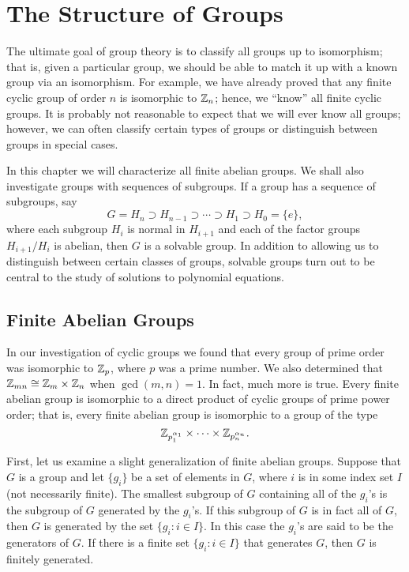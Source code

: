 \chapter{The Structure of  Groups}
 
 
 
The ultimate goal of group theory is to classify all groups up to
isomorphism; that is, given a particular group, we should be able to
match it up with a known group via an isomorphism. For example, we
have already proved that any finite cyclic group of order $n$ is
isomorphic to ${\Bbb Z}_n$; hence, we ``know'' all finite cyclic
groups. It is probably not reasonable to expect that we will ever know
all groups; however, we can often classify certain types of groups or
distinguish between groups in special cases.  
 
 
In this chapter we will characterize all finite abelian groups. We
shall also investigate groups with sequences of subgroups.  If a group
has a sequence of subgroups, say 
\[
G = H_n \supset H_{n-1} \supset \cdots \supset H_1 \supset H_0 = \{ e
\}, 
\]
where each subgroup $H_i$ is normal in $H_{i+1}$ and each of the
factor groups $H_{i+1}/H_i$ is abelian, then $G$ is a solvable group.
In addition to allowing us to distinguish between certain classes of
groups, solvable groups turn out to be central to the study of
solutions to polynomial equations.
 
 
 
\section{Finite Abelian Groups}
 
 
 
In our investigation of cyclic groups we found that every group of
prime order was isomorphic to ${\Bbb Z}_p$, where $p$ was a prime
number.  We also determined that ${\Bbb Z}_{mn} \cong {\Bbb Z}_m
\times {\Bbb Z}_n$ when $\gcd(m, n) =1$. In fact, much more is true.
Every finite abelian group is isomorphic to a direct product of cyclic
groups of prime power order; that is, every finite abelian group is
isomorphic to a group of the type 
\[
{\Bbb Z}_{p_1^{\alpha_1}} \times \cdots \times {\Bbb
Z}_{p_n^{\alpha_n}}.
\]
 
 
First, let us examine a slight generalization  of finite abelian
groups. Suppose that $G$ is a group and let $\{ g_i\}$ be a set of 
elements in $G$, where $i$ is in some index set $I$ (not necessarily 
finite).  The smallest subgroup of $G$ containing all of the $g_i$'s 
is the subgroup of $G$ {\bfi generated\/} by the $g_i$'s. If this 
subgroup of $G$ is in fact all of $G$, then $G$ is generated by the 
set $\{g_i : i \in I \}$. In this case the $g_i$'s are said to be 
the {\bfi generators\/} of $G$. If there is a finite set 
$\{ g_i : i \in I \}$ that generates $G$, then $G$ is {\bfi finitely 
generated}.
 
